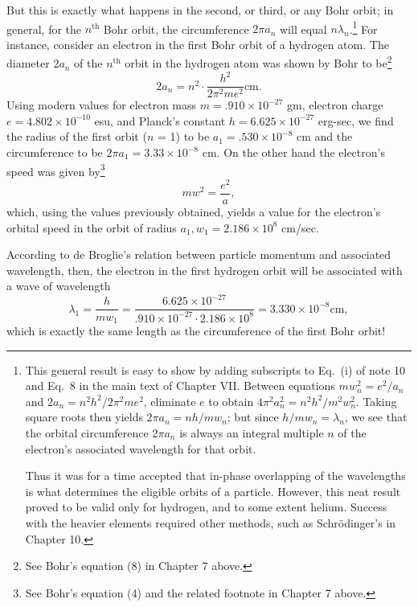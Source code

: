 But this is exactly what happens in the second, or third, or any Bohr
orbit; in general, for the $n^{\text{th}}$ Bohr orbit, the circumference
$2\pi a_n$ will equal $n\lambda_n$.\footnote{This general result is easy to show
  by adding subscripts to Eq.\ (i) of note 10 and
  Eq.\ 8 in the main text of Chapter VII. Between equations 
  $mw_n^2 = e^2/a_n$ and $2a_n = n^2h^2/2\pi^2me^2$,  eliminate $e$ to obtain
  $4\pi^2a_n^2 = n^2h^2/m^2w_n^2$. Taking
  square roots then yields $2\pi a_n = nh/mw_n$;
  but since $h/mw_n = \lambda_n$, we see
  that the orbital circumference $2\pi a_n$ is always
  an integral multiple $n$ of the electron's associated wavelength
  for that orbit.

  Thus it was for a time accepted that in-phase overlapping of the
  wavelengths is what determines the eligible orbits of a particle.
  However, this neat result proved to be valid only for hydrogen, and to
  some extent helium. Success with the heavier elements required other
  methods, such as Schrödinger's in Chapter 10.} For instance, consider an
electron in the first Bohr orbit of a hydrogen atom. The diameter
$2a_n$ of the $n^{\text{th}}$ orbit in the hydrogen atom
was shown by Bohr to be\footnote{See Bohr's equation (8) in Chapter 7 above.}
%
\begin{equation*}
2a_n = n^2 \cdot \frac{h^2}{2\pi^2me^2} \text{cm.}
\end{equation*}
%
Using modern values for electron mass $m = .910\!\times\!10^{-27}$ gm,
electron charge $e = 4.802\!\times\!10^{-10}$ esu, and Planck's constant
$h = 6.625\!\times\!10^{-27}$ erg-sec, we find the radius of the first orbit
($n$ = 1) to be $a_1 = .530\!\times\!10^{-8}$ cm and the
circumference to be $2\pi a_1 = 3.33\!\times\!10^{-8}$ cm. On the
other hand the electron's speed was given by\footnote{See Bohr's
  equation (4) and the related footnote in Chapter 7 above.}
%
\begin{equation*}
mw^2 = \frac{e^2}{a} ,
%
\end{equation*}
which, using the values previously obtained, yields a value for the
electron's orbital speed in the orbit of radius
$a_1, w_1 = 2.186\!\times\!10^8$ cm/sec.

According to de Broglie's relation between particle momentum and
associated wavelength, then, the electron in the first hydrogen orbit
will be associated with a wave of wavelength
\begin{equation*}
\lambda_1 = \frac{h}{mw_1} = \frac{6.625\!\times\!10^{-27}}{.910\!\times\!10^{-27}\cdot2.186\!\times\!10^8}
 = 3.330\!\times\!10^{-8} \text{cm},
\end{equation*}
which is exactly the same length as the circumference of the first Bohr orbit!


